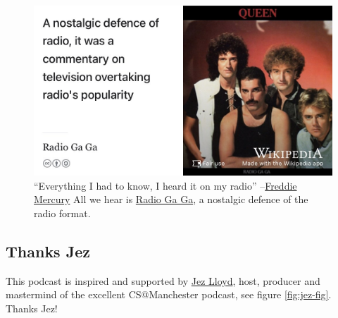 \documentclass[
]{book}
\begin{document}
\begin{figure}

{\centering \includegraphics[width=0.99\linewidth]{images/Everything-I-had-to-know-I-heard-it-on-my-radio} 

}

\caption{``Everything I had to know, I heard it on my radio'' --\href{https://en.wikipedia.org/wiki/Freddie_Mercury}{Freddie Mercury} \citep{radiogaga} All we hear is \href{https://en.wikipedia.org/wiki/Radio_Ga_Ga}{Radio Ga Ga}, a nostalgic defence of the radio format.}\label{fig:gaga-fig}
\end{figure}



\hypertarget{jez}{%
\subsection{Thanks Jez}\label{jez}}

This podcast is inspired and supported by \href{https://www.linkedin.com/in/jez-lloyd-84077069}{Jez Lloyd}, host, producer and mastermind of the excellent CS@Manchester podcast, see figure \ref{fig:jez-fig}. Thanks Jez! 🙏
\end{document}

